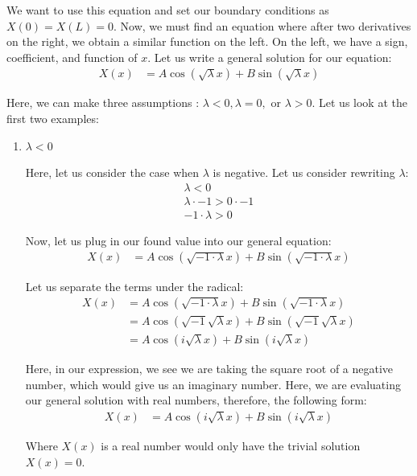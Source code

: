 \documentclass{article}
\begin{document}
\begin{enumerate}
We want to use this equation and set our boundary conditions as $X(0) = X(L) = 0$. Now, we must find an equation where after two derivatives on the right, we obtain a similar function on the left. On the left, we have a sign, coefficient, and function of $x$. Let us write a general solution for our equation:
%
\begin{align}
  X(x) & = A \cos(\sqrt \lambda x) + B \sin( \sqrt \lambda x)
\end{align}

Here, we can make three assumptions : $\lambda < 0, \lambda = 0,$ or $\lambda > 0$. Let us look at the first two examples:

\begin{enumerate}
  \item $\lambda < 0$

  Here, let us consider the case when $\lambda$ is negative. Let us consider rewriting $\lambda$:
  \begin{align}
    \lambda < 0\\
    \lambda \cdot -1 > 0 \cdot -1\\
    -1 \cdot \lambda > 0
  \end{align}

  Now, let us plug in our found value into our general equation:
  \begin{align}
    X(x) & =
    A \cos (\sqrt{- 1 \cdot \lambda} x) +
    B \sin (\sqrt{- 1 \cdot \lambda} x)
  \end{align}

  Let us separate the terms under the radical:
%
  \begin{align}
    X(x) & =
    A \cos (\sqrt{- 1 \cdot \lambda} x) +
    B \sin (\sqrt{- 1 \cdot \lambda} x)\\
    & =
    A \cos (\sqrt{- 1} \sqrt{\lambda} x) +
    B \sin (\sqrt{- 1} \sqrt{\lambda} x)\\
    & =
    A \cos (i \sqrt{\lambda} x) +
    B \sin (i \sqrt{\lambda} x)
  \end{align}

  Here, in our expression, we see we are taking the square root of a negative number, which would give us an imaginary number. Here, we are evaluating our general solution with real numbers, therefore, the following form:
  \begin{align}
    X(x) & =
    A \cos (i \sqrt{\lambda} x) +
    B \sin (i \sqrt{\lambda} x)
  \end{align}

  Where $X(x)$ is a real number would only have the trivial solution $X(x) = 0$.


\end{enumerate}
\end{enumerate}
\end{document}
